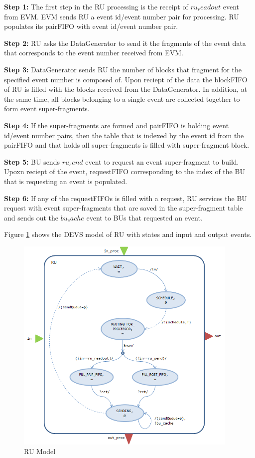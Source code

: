 \textbf{Step 1:} The first step in the RU processing is the receipt of $ru_readout$ event from EVM. EVM sends RU a event id/event number pair for processing. RU populates its pairFIFO with event id/event number pair.

\textbf{Step 2:} RU asks the DataGenerator to send it the fragments of the event data that corresponds to the event number received from EVM.

\textbf{Step 3:} DataGenerator sends RU the number of blocks that  fragment for the specified event number is composed of. Upon reciept of the data the blockFIFO of RU is filled with the blocks received from the DataGenerator. In addition, at the same time, all blocks belonging to a single event are collected together to form event super-fragments.

\textbf{Step 4:} If the super-fragments are formed and pairFIFO is holding event id/event number pairs, then the table that is indexed by the event id from the pairFIFO and that holds all super-fragments is filled with super-fragment block.

\textbf{Step 5:} BU sends $ru_send$ event to request an event super-fragment to build. Upoxn reciept of the event, requestFIFO corresponding to the index of the BU that is requesting an event is populated.

\textbf{Step 6:} If any of the requestFIFOs is filled with a request, RU services the BU request with event super-fragments that are saved in the super-fragment table and sends out the $bu_cache$ event to BUs that requested an event.

Figure \ref{fig:rumodel1} shows the DEVS model of RU with states and input and output events.

\begin{figure}
	\centering
		\includegraphics[width=0.95\textwidth]{figures/rumodel1.png}
	\caption{RU Model}
	\label{fig:rumodel1}
\end{figure}

